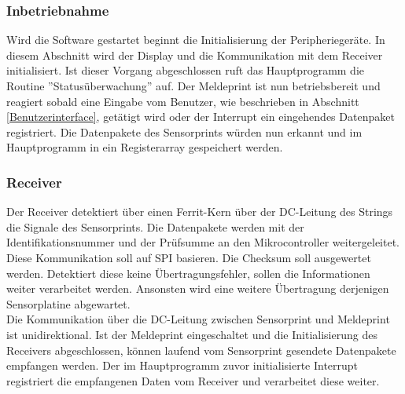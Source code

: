 \subsubsection{Inbetriebnahme}
Wird die Software gestartet beginnt die Initialisierung der Peripheriegeräte. In diesem Abschnitt wird der Display und die Kommunikation mit dem Receiver initialisiert. Ist dieser Vorgang abgeschlossen ruft das Hauptprogramm die Routine ''Statusüberwachung'' auf. Der Meldeprint ist nun betriebsbereit und reagiert sobald eine Eingabe vom Benutzer, wie beschrieben in Abschnitt \ref{Benutzerinterface}, getätigt wird oder der Interrupt ein eingehendes Datenpaket registriert. Die Datenpakete des Sensorprints würden nun erkannt und im Hauptprogramm in ein Registerarray gespeichert werden.
\subsubsection{Receiver}
Der Receiver detektiert über einen Ferrit-Kern über der DC-Leitung des Strings die Signale des Sensorprints. Die Datenpakete werden mit der Identifikationsnummer und der Prüfsumme an den Mikrocontroller weitergeleitet. Diese Kommunikation soll auf SPI basieren. Die Checksum soll ausgewertet werden. Detektiert diese keine Übertragungsfehler, sollen die Informationen weiter verarbeitet werden. Ansonsten wird eine weitere Übertragung derjenigen Sensorplatine abgewartet. \\
Die Kommunikation über die DC-Leitung zwischen Sensorprint und Meldeprint ist unidirektional. Ist der Meldeprint eingeschaltet und die Initialisierung des Receivers abgeschlossen, können laufend vom Sensorprint gesendete Datenpakete empfangen werden. Der im Hauptprogramm zuvor initialisierte Interrupt registriert die empfangenen Daten vom Receiver und verarbeitet diese weiter.
